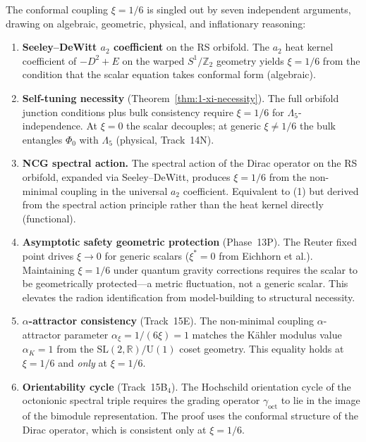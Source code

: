 \begin{remark}[Seven-fold convergence of $\xi = 1/6$]
\label{rem:1-seven-proofs}
The conformal coupling $\xi = 1/6$ is singled out by seven independent arguments, drawing on algebraic, geometric, physical, and inflationary reasoning:
\begin{enumerate}
\item \textbf{Seeley--DeWitt $a_2$ coefficient} on the RS orbifold. The $a_2$ heat kernel coefficient of $-D^2 + E$ on the warped $S^1/\mathbb{Z}_2$ geometry yields $\xi = 1/6$ from the condition that the scalar equation takes conformal form (algebraic).

\item \textbf{Self-tuning necessity} (Theorem~\ref{thm:1-xi-necessity}). The full orbifold junction conditions plus bulk consistency require $\xi = 1/6$ for $\Lambda_5$-independence. At $\xi = 0$ the scalar decouples; at generic $\xi \neq 1/6$ the bulk entangles $\Phi_0$ with $\Lambda_5$ (physical, Track~14N).

\item \textbf{NCG spectral action.} The spectral action of the Dirac operator on the RS orbifold, expanded via Seeley--DeWitt, produces $\xi = 1/6$ from the non-minimal coupling in the universal $a_2$ coefficient. Equivalent to (1) but derived from the spectral action principle rather than the heat kernel directly (functional).

\item \textbf{Asymptotic safety geometric protection} (Phase~13P). The Reuter fixed point drives $\xi \to 0$ for generic scalars ($\xi^* = 0$ from Eichhorn et al.). Maintaining $\xi = 1/6$ under quantum gravity corrections requires the scalar to be geometrically protected---a metric fluctuation, not a generic scalar. This elevates the radion identification from model-building to structural necessity.

\item \textbf{$\alpha$-attractor consistency} (Track~15E). The non-minimal coupling $\alpha$-attractor parameter $\alpha_\xi = 1/(6\xi) = 1$ matches the K\"ahler modulus value $\alpha_K = 1$ from the $\mathrm{SL}(2,\mathbb{R})/\mathrm{U}(1)$ coset geometry. This equality holds at $\xi = 1/6$ and \emph{only} at $\xi = 1/6$.

\item \textbf{Orientability cycle} (Track~15B$_4$). The Hochschild orientation cycle of the octonionic spectral triple requires the grading operator $\gamma_\mathrm{oct}$ to lie in the image of the bimodule representation. The proof uses the conformal structure of the Dirac operator, which is consistent only at $\xi = 1/6$.


\end{enumerate}
\end{remark}
